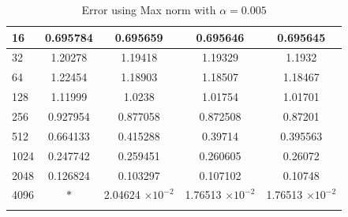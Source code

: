 \begin{table}[H]
\begin{tabular}{lcccc}
		\midrule
		\hspace{7mm} 16 & 0.695784 & 0.695659  & 0.695646  & 0.695645 \\
		\midrule
		\hspace{7mm} 32 & 1.20278  & 1.19418   & 1.19329   & 1.1932   \\
		\midrule
		\hspace{7mm} 64 & 1.22454  & 1.18903   & 1.18507   & 1.18467  \\
		\midrule
		\hspace{7mm} 128 & 1.11999  & 1.0238    & 1.01754   & 1.01701  \\
		\midrule
		\hspace{7mm} 256 & 0.927954 & 0.877058  & 0.872508  & 0.87201  \\
		\midrule
		\hspace{7mm} 512 & 0.664133 & 0.415288  & 0.39714   & 0.395563 \\
		\midrule
		\hspace{7mm} 1024 & 0.247742 & 0.259451  & 0.260605  & 0.26072  \\
		\midrule
		\hspace{7mm} 2048 & 0.126824 & 0.103297  & 0.107102  & 0.10748  \\
		\midrule
		\hspace{7mm} 4096 & $\ast$        & 2.04624 $\times 10 ^{-2}$ & 1.76513  $\times 10 ^{-2}$ & 1.76513  $\times 10 ^{-2}$        \\
		\\
		\bottomrule
	\end{tabular}
	\caption{Error using Max norm with $\alpha=0.005$}
	\label{Collocation_tabla_max_alpha=005}
	\end{table}